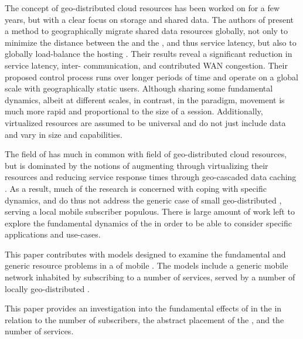 The concept of geo-distributed cloud resources has been worked on for a few years, but with a clear focus on storage and shared data. The authors of \cite{agarwal2010volley} present a method to geographically migrate shared data resources globally, not only to minimize the distance between the \ue{} and the \dc{}, and thus service latency, but also to globally load-balance the hosting \dcs{}. Their results reveal a significant reduction in service latency, inter-\dc{} communication, and contributed WAN congestion. Their proposed control process runs over longer periods of time and operate on a global scale with geographically static users. Although sharing some fundamental dynamics, albeit at different scales, in contrast, in the \xcloud{} paradigm, \ue{} movement is much more rapid and proportional to the size of a session. Additionally, \xcloud{} virtualized resources are assumed to be universal and do not just include data and vary in size and capabilities.

The field of \xcloud{} has much in common with field of geo-distributed cloud resources, but is dominated by the notions of augmenting \ues{} through virtualizing their resources \cite{6563280} and reducing service response times through geo-cascaded data caching \cite{1437087,ericsson_akami}. As a result, much of the research is concerned with coping with specific dynamics, and do thus not address the generic case of small geo-distributed \dcs, serving a local mobile subscriber populous. There is large amount of work left to explore the fundamental dynamics of the \xcloud{} in order to be able to consider specific applications and use-cases.

This paper contributes with models designed to examine the fundamental and generic resource problems in a \xcloud{} of mobile \ues{}. The models include a generic mobile network inhabited by \ues{} subscribing to a number of services, served by a number of locally geo-distributed \dcs{}.

This paper provides an investigation into the fundamental effects of \ue{} in the \xcloud{} in relation to the number of subscribers, the abstract placement of the \dc{}, and the number of services. %

